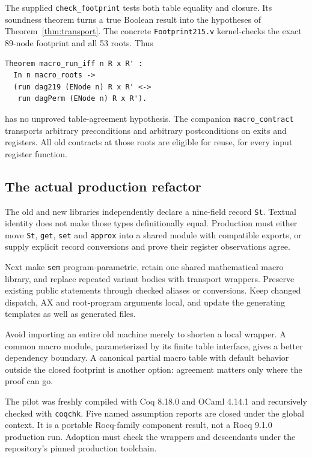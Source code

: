 The supplied \texttt{check\_footprint} tests both table equality and closure. Its soundness theorem turns a true Boolean result into the hypotheses of Theorem~\ref{thm:transport}. The concrete \texttt{Footprint215.v} kernel-checks the exact 89-node footprint and all 53 roots. Thus
\begin{lstlisting}
Theorem macro_run_iff n R x R' :
  In n macro_roots ->
  (run dag219 (ENode n) R x R' <->
   run dagPerm (ENode n) R x R').
\end{lstlisting}
has no unproved table-agreement hypothesis. The companion \texttt{macro\_contract} transports arbitrary preconditions and arbitrary postconditions on exits and registers. All old contracts at those roots are eligible for reuse, for every input register function.

\subsection{The actual production refactor}
The old and new libraries independently declare a nine-field record \texttt{St}. Textual identity does not make those types definitionally equal. Production must either move \texttt{St}, \texttt{get}, \texttt{set} and \texttt{approx} into a shared module with compatible exports, or supply explicit record conversions and prove their register observations agree.

Next make \texttt{sem} program-parametric, retain one shared mathematical macro library, and replace repeated variant bodies with transport wrappers. Preserve existing public statements through checked aliases or conversions. Keep changed dispatch, AX and root-program arguments local, and update the generating templates as well as generated files.

Avoid importing an entire old machine merely to shorten a local wrapper. A common macro module, parameterized by its finite table interface, gives a better dependency boundary. A canonical partial macro table with default behavior outside the closed footprint is another option: agreement matters only where the proof can go.

The pilot was freshly compiled with Coq 8.18.0 and OCaml 4.14.1 and recursively checked with \texttt{coqchk}. Five named assumption reports are closed under the global context. It is a portable Rocq-family component result, not a Rocq 9.1.0 production run. Adoption must check the wrappers and descendants under the repository's pinned production toolchain.

